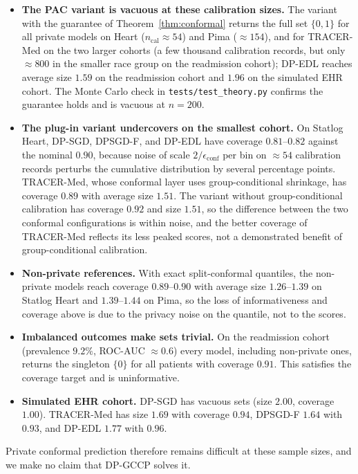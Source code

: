 \documentclass[3p,12pt]{elsarticle}
\theoremstyle{plain}
\theoremstyle{definition}
\begin{document}
\begin{itemize}
    \item \textbf{The PAC variant is vacuous at these calibration sizes.} The variant with the guarantee of Theorem~\ref{thm:conformal} returns the full set $\{0,1\}$ for all private models on Heart ($n_{\text{cal}}\approx 54$) and Pima ($\approx 154$), and for TRACER-Med on the two larger cohorts (a few thousand calibration records, but only $\approx 800$ in the smaller race group on the readmission cohort); DP-EDL reaches average size $1.59$ on the readmission cohort and $1.96$ on the simulated EHR cohort. The Monte Carlo check in \texttt{tests/test\_theory.py} confirms the guarantee holds and is vacuous at $n=200$.
    \item \textbf{The plug-in variant undercovers on the smallest cohort.} On Statlog Heart, DP-SGD, DPSGD-F, and DP-EDL have coverage $0.81$--$0.82$ against the nominal $0.90$, because noise of scale $2/\epsilon_{\text{conf}}$ per bin on $\approx 54$ calibration records perturbs the cumulative distribution by several percentage points. TRACER-Med, whose conformal layer uses group-conditional shrinkage, has coverage $0.89$ with average size $1.51$. The variant without group-conditional calibration has coverage $0.92$ and size $1.51$, so the difference between the two conformal configurations is within noise, and the better coverage of TRACER-Med reflects its less peaked scores, not a demonstrated benefit of group-conditional calibration.
    \item \textbf{Non-private references.} With exact split-conformal quantiles, the non-private models reach coverage $0.89$--$0.90$ with average size $1.26$--$1.39$ on Statlog Heart and $1.39$--$1.44$ on Pima, so the loss of informativeness and coverage above is due to the privacy noise on the quantile, not to the scores.
    \item \textbf{Imbalanced outcomes make sets trivial.} On the readmission cohort (prevalence $9.2\%$, ROC-AUC $\approx 0.6$) every model, including non-private ones, returns the singleton $\{0\}$ for all patients with coverage $0.91$. This satisfies the coverage target and is uninformative.
    \item \textbf{Simulated EHR cohort.} DP-SGD has vacuous sets (size $2.00$, coverage $1.00$). TRACER-Med has size $1.69$ with coverage $0.94$, DPSGD-F $1.64$ with $0.93$, and DP-EDL $1.77$ with $0.96$.
\end{itemize}
Private conformal prediction therefore remains difficult at these sample sizes, and we make no claim that DP-GCCP solves it.
\end{document}
